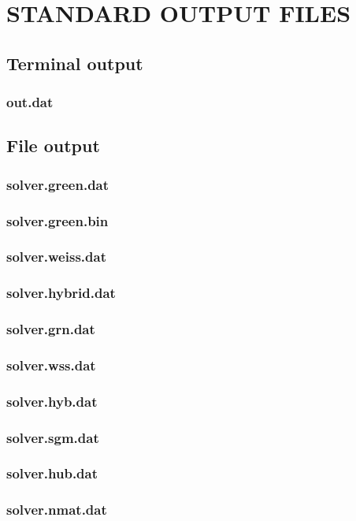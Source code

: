 \chapter{STANDARD OUTPUT FILES}
\section{Terminal output}
\subsection{out.dat}
\section{File output}
\subsection{solver.green.dat}
\subsection{solver.green.bin}
\subsection{solver.weiss.dat}
\subsection{solver.hybrid.dat}
\subsection{solver.grn.dat}
\subsection{solver.wss.dat}
\subsection{solver.hyb.dat}
\subsection{solver.sgm.dat}
\subsection{solver.hub.dat}
\subsection{solver.nmat.dat}

